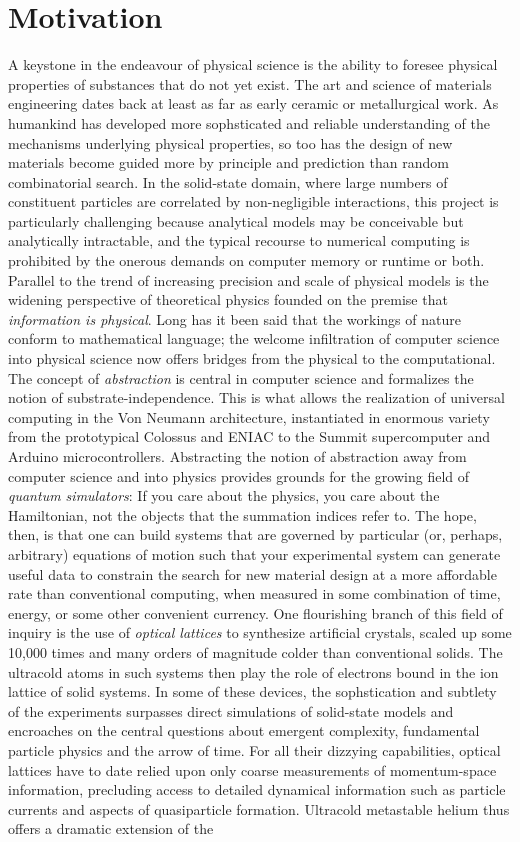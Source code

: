 \section{Motivation}
	A keystone in the endeavour of physical science is the ability to foresee physical properties of substances that do not yet exist. The art and science of materials engineering dates back at least as far as early ceramic or metallurgical work. As humankind has developed more sophsticated and reliable understanding of the mechanisms underlying physical properties, so too has the design of new materials become guided more by principle and prediction than random combinatorial search. In the solid-state domain, where large numbers of constituent particles are correlated by non-negligible interactions, this project is particularly challenging because analytical models may be conceivable but analytically intractable, and the typical recourse to numerical computing is prohibited by the onerous demands on computer memory or runtime or both. Parallel to the trend of increasing precision and scale of physical models is the widening perspective of theoretical physics founded on the premise that \emph{information is physical}. Long has it been said that the workings of nature conform to mathematical language; the welcome infiltration of computer science into physical science now offers bridges from the physical to the computational. The concept of \emph{abstraction} is central in computer science and formalizes the notion of substrate-independence. This is what allows the realization of universal computing in the Von Neumann architecture, instantiated in enormous variety from the prototypical Colossus and ENIAC to the Summit supercomputer and Arduino microcontrollers. Abstracting the notion of abstraction away from computer science and into physics provides grounds for the growing field of \emph{quantum simulators}: If you care about the physics, you care about the Hamiltonian, not the objects that the summation indices refer to. The hope, then, is that one can build systems that are governed by  particular (or, perhaps, arbitrary) equations of motion such that your experimental system can generate useful data to constrain the search for new material design at a more affordable rate than conventional computing, when measured in some combination of time, energy, or some other convenient currency. One flourishing branch of this field of inquiry is the use of \emph{optical lattices} to synthesize artificial crystals, scaled up some 10,000 times and many orders of magnitude colder than conventional solids. The ultracold atoms in such systems then play the role of electrons bound in the ion lattice of solid systems. In some of these devices, the sophstication and subtlety of the experiments surpasses direct simulations of solid-state models and encroaches on the central questions about emergent complexity, fundamental particle physics and the arrow of time. For all their dizzying capabilities, optical lattices have to date relied upon only coarse measurements of momentum-space information, precluding access to detailed dynamical information such as particle currents and aspects of quasiparticle formation. Ultracold metastable helium thus offers a dramatic extension of the 